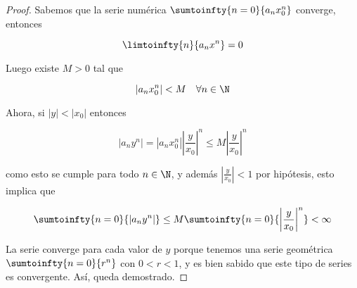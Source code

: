 \begin{proof}
    Sabemos que la serie numérica $\sumtoinfty{n=0}{a_nx_0^n}$ converge, entonces
    
    \[
    \limtoinfty{n}{a_nx^n} = 0
    \]
    
    Luego existe $M > 0$ tal que
    
    \[
    |a_nx_0^n| < M \quad \forall n \in \N
    \]
    
    Ahora, si $|y| < |x_0|$ entonces
    
    \[
    |a_ny^n| = |a_nx_0^n|\left|\frac{y}{x_0}\right|^n \leq M\left|\frac{y}{x_0}\right|^n
    \]
    
    \noindent como esto se cumple para todo $n \in \N$, y además $\left|\frac{y}{x_0}\right| < 1$ por hipótesis, esto implica que
    
    \[
    \sumtoinfty{n=0}{|a_ny^n|} \leq M\sumtoinfty{n=0}{\left|\frac{y}{x_0}\right|^n} < \infty
    \]
    
    La serie converge para cada valor de $y$ porque tenemos una serie geométrica $\sumtoinfty{n=0}{r^n}$ con $0 < r < 1$, y es bien sabido que este tipo de series es convergente. Así, queda demostrado.
\end{proof}

